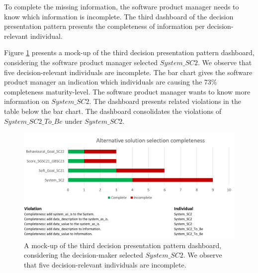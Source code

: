 To complete the missing information, the software product manager needs to know which information is incomplete. The third dashboard of the decision presentation pattern presents the completeness of information per decision-relevant individual.

Figure \ref{fig:05_AS_Dashboard_Component_3_AS_DEC1_Completeness} presents a mock-up of the third decision presentation pattern dashboard, considering the software product manager selected $System\_SC2$. We observe that five decision-relevant individuals are incomplete. The bar chart gives the software product manager an indication which individuals are causing the 73\% completeness maturity-level. The software product manager wants to know more information on $System\_SC2$. The dashboard presents related violations in the table below the bar chart. The dashboard consolidates the violations of $System\_SC2\_To\_Be$ under $System\_SC2$.

\begin{figure}[H]
\centering
  \includegraphics[width=16cm]{../../Images/05_Validation/05_AS_Dashboard_Component_3_AS_DEC1_Completeness.png}
  \caption{A mock-up of the third decision presentation pattern dashboard, considering the decision-maker selected $System\_SC2$. We observe that five decision-relevant individuals are incomplete.}
  \label{fig:05_AS_Dashboard_Component_3_AS_DEC1_Completeness}
\end{figure}
